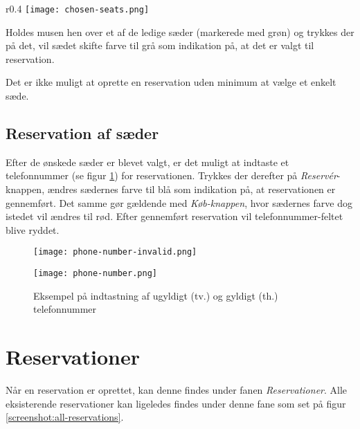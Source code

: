 \begin{wrapfigure}[4]{r}{0.4\textwidth}
  \centering
  \vspace{-12pt}
  \texttt{[image: chosen-seats.png]}
  \caption{Eksempel på valg af sæder}
  \label{screenshot:chosen-seats}
\end{wrapfigure}

Holdes musen hen over et af de ledige sæder (markerede med grøn) og trykkes der på det, vil sædet skifte farve til grå som indikation på, at det er valgt til reservation.

Det er ikke muligt at oprette en reservation uden minimum at vælge et enkelt sæde.

\subsection{Reservation af sæder}

Efter de ønskede sæder er blevet valgt, er det muligt at indtaste et telefonnummer (se figur \ref{screenshot:phone-number}) for reservationen. Trykkes der derefter på \textit{Reservér}-knappen, ændres sædernes farve til blå som indikation på, at reservationen er gennemført. Det samme gør gældende med \textit{Køb-knappen}, hvor sædernes farve dog istedet vil ændres til rød. Efter gennemført reservation vil telefonnummer-feltet blive ryddet.

\begin{figure}[h]
  \centering
  \begin{minipage}[b]{0.4\linewidth}
    \centering
    \texttt{[image: phone-number-invalid.png]}
  \end{minipage}
  \hspace{0.5cm}
  \begin{minipage}[b]{0.4\linewidth}
    \centering
    \texttt{[image: phone-number.png]}
  \end{minipage}

  \caption{Eksempel på indtastning af ugyldigt (tv.) og gyldigt (th.) telefonnummer}
  \label{screenshot:phone-number}
\end{figure}

\section{Reservationer}

Når en reservation er oprettet, kan denne findes under fanen \textit{Reservationer}. Alle eksisterende reservationer kan ligeledes findes under denne fane som set på figur \ref{screenshot:all-reservations}.


